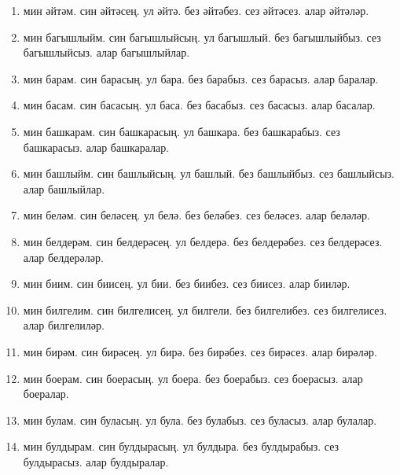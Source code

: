 \documentclass{article}
\begin{document}
\begin{enumerate}
    \item
    мин әйтәм.
    син әйтәсең.
    ул әйтә.
    без әйтәбез.
    сез әйтәсез.
    алар әйтәләр.

    \item
    мин багышлыйм.
    син багышлыйсың.
    ул багышлый.
    без багышлыйбыз.
    сез багышлыйсыз.
    алар багышлыйлар.

    \item
    мин барам.
    син барасың.
    ул бара.
    без барабыз.
    сез барасыз.
    алар баралар.

    \item
    мин басам.
    син басасың.
    ул баса.
    без басабыз.
    сез басасыз.
    алар басалар.

    \item
    мин башкарам.
    син башкарасың.
    ул башкара.
    без башкарабыз.
    сез башкарасыз.
    алар башкаралар.

    \item
    мин башлыйм.
    син башлыйсың.
    ул башлый.
    без башлыйбыз.
    сез башлыйсыз.
    алар башлыйлар.

    \item
    мин беләм.
    син беләсең.
    ул белә.
    без беләбез.
    сез беләсез.
    алар беләләр.

    \item
    мин белдерәм.
    син белдерәсең.
    ул белдерә.
    без белдерәбез.
    сез белдерәсез.
    алар белдерәләр.

    \item
    мин биим.
    син биисең.
    ул бии.
    без биибез.
    сез биисез.
    алар бииләр.

    \item
    мин билгелим.
    син билгелисең.
    ул билгели.
    без билгелибез.
    сез билгелисез.
    алар билгелиләр.

    \item
    мин бирәм.
    син бирәсең.
    ул бирә.
    без бирәбез.
    сез бирәсез.
    алар бирәләр.

    \item
    мин боерам.
    син боерасың.
    ул боера.
    без боерабыз.
    сез боерасыз.
    алар боералар.

    \item
    мин булам.
    син буласың.
    ул була.
    без булабыз.
    сез буласыз.
    алар булалар.

    \item
    мин булдырам.
    син булдырасың.
    ул булдыра.
    без булдырабыз.
    сез булдырасыз.
    алар булдыралар.


\end{enumerate}
\end{document}
